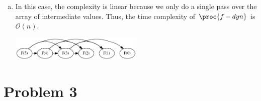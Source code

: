 \documentclass[a4paper, 10pt, twoside]{article}
\begin{document}
\begin{enumerate}[a)]
	\item In this case, the complexity is linear because we only do a single pass over the array of intermediate values. Thus, the time complexity of $\proc{f-dyn}$ is $\mathcal{O}(n)$.

	      \begin{center}
		      \includegraphics[width=0.5\textwidth]{fib_dyn.png}
	      \end{center}

\end{enumerate}

\section*{Problem 3}
\end{document}
